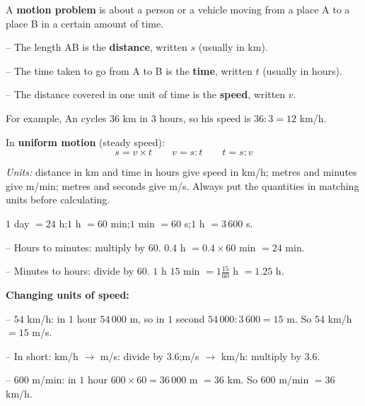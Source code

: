 \begin{knowbox}
\begin{minipage}[t]{0.6\linewidth}
A \textbf{motion problem} is about a person or a vehicle moving from a place A to a place B in a certain amount of time.\par
\smallskip
-- The length AB is the \textbf{distance}, written $s$ (usually in km).\par
-- The time taken to go from A to B is the \textbf{time}, written $t$ (usually in hours).\par
-- The distance covered in one unit of time is the \textbf{speed}, written $v$.\par
\smallskip
For example, An cycles $36$ km in $3$ hours, so his speed is $36:3=12$ km/h.\par
\smallskip
In \textbf{uniform motion} (steady speed):
\[s=v\times t\qquad v=s:t\qquad t=s:v\]
\end{minipage}\hfill
\begin{minipage}[t]{0.36\linewidth}\vspace{18pt}\centering
{}
\end{minipage}\par
\smallskip
\emph{Units:} distance in km and time in hours give speed in km/h; metres and minutes give m/min; metres and seconds give m/s. Always put the quantities in matching units before calculating.
\end{knowbox}

\begin{knowbox}
$1$ day $=24$ h;\quad $1$ h $=60$ min;\quad $1$ min $=60$ s;\quad $1$ h $=3\,600$ s.\par
\smallskip
-- Hours to minutes: multiply by $60$. \quad $0.4$ h $=0.4\times60$ min $=24$ min.\par
-- Minutes to hours: divide by $60$. \quad $1$ h $15$ min $=1\frac{15}{60}$ h $=1.25$ h.\par
\smallskip
\textbf{Changing units of speed:}\par
-- $54$ km/h: in $1$ hour $54\,000$ m, so in $1$ second $54\,000:3\,600=15$ m. So $54$ km/h $=15$ m/s.\par
-- In short: km/h $\to$ m/s: divide by $3.6$;\quad m/s $\to$ km/h: multiply by $3.6$.\par
-- $600$ m/min: in $1$ hour $600\times60=36\,000$ m $=36$ km. So $600$ m/min $=36$ km/h.
\end{knowbox}


